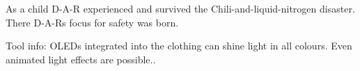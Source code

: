 \begin{npcBox}[title=Pioneer: Drop-and-run]
    \begin{stressSection}
    \end{stressSection}
    \begin{tabularx}{\textwidth}{ XX }
    \end{tabularx}

    \begin{consequences}
    \item {}
    \item {}
    \item {}
    \end{consequences}

    \begin{npcDescription}

    As a child D-A-R experienced and survived the Chili-and-liquid-nitrogen disaster. There D-A-Rs focus for safety was born.

    Tool info: OLEDs integrated into the clothing can shine light in all colours. Even animated light effects are possible..

    \end{npcDescription}

\end{npcBox}

\newpage


